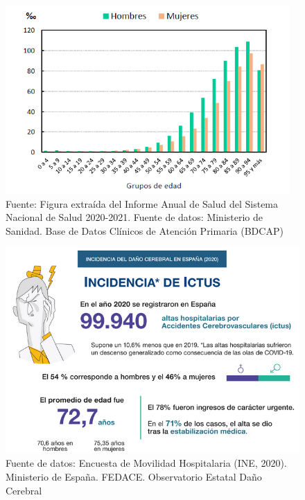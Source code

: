 \begin{figure}[ht!]
	\centering
	\begin{minipage}{0.65\linewidth}
		\centering
		\includegraphics[width=\linewidth]{figs/edad_ictus_es.png}
	\end{minipage}
	\caption[Prevalencia registrada de enfermedad cerebro-vascular según sexo y edad en España, 2019]{Fuente: Figura extraída del Informe Anual de Salud del Sistema Nacional de Salud 2020-2021.
	Fuente de datos: Ministerio de Sanidad. Base de Datos Clínicos de Atención Primaria (BDCAP)}
	\label{fig:grafica}
\end{figure}

\begin{figure}[ht!]
	\centering
	\begin{minipage}{0.65\linewidth}
		\centering
		\includegraphics[width=\linewidth]{figs/incidencia_ictus_es.png}
	\end{minipage}
	\caption[Incidencia del ictus en España, 2020]{Fuente de datos: Encuesta de Movilidad Hospitalaria (INE, 2020). Ministerio de España. FEDACE. Observatorio Estatal Daño Cerebral}
	\label{fig:grafica2}
\end{figure}

